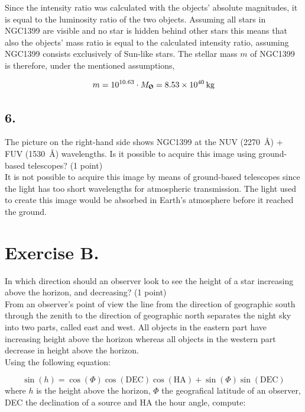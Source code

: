 \documentclass[11pt,a4paper,twoside]{article}
\begin{document}
Since the intensity ratio was calculated with the objects' absolute magnitudes, it is equal to the luminosity ratio of the two objects. Assuming all stars in NGC1399 are visible and no star is hidden behind other stars this means that also the objects' mass ratio is equal to the calculated intensity ratio, assuming NGC1399 consists exclusively of Sun-like stars. The stellar mass $m$ of NGC1399 is therefore, under the mentioned assumptions, 

\begin{equation}
 m = 10^{10.63} \cdot M_{\text{\Sun}} = \SI{8.53e40}{\kg}
\end{equation}

\subsection*{6.} The picture on the right-hand side shows NGC1399 at the NUV (\SI{2270}{\angstrom}) + FUV (\SI{1530}{\angstrom}) wavelengths. Is it possible to acquire this image using ground-based telescopes? (1 point) \\

It is not possible to acquire this image by means of ground-based telescopes since the light has too short wavelengths for atmospheric transmission. The light used to create this image would be absorbed in Earth's atmosphere before it reached the ground. \\

\section*{Exercise B.}
\label{sec:b}

In which direction should an observer look to see the height of a star increasing above the horizon, and decreasing? (1 point) \\

From an observer's point of view the line from the direction of geographic south through the zenith to the direction of geographic north separates the night sky into two parts, called east and west. All objects in the eastern part have increasing height above the horizon whereas all objects in the western part decrease in height above the horizon. \\

Using the following equation: 

\begin{equation}
 \sin{ \left( h \right)} = \cos{ \left( \Phi \right)} \cos{ \left( \text{DEC} \right)} \cos{ \left( \text{HA} \right)} + \sin{ \left( \Phi \right)} \sin{ \left( \text{DEC} \right)}
\end{equation}
where $h$ is the height above the horizon, $\Phi$ the geografical latitude of an observer, DEC the declination of a source and HA the hour angle, compute: 
\end{document}

